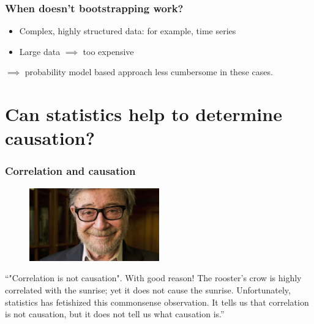 \documentclass[handout]{beamer}
\begin{document}
\begin{frame}
	\frametitle{When doesn't bootstrapping work?}
	
	\begin{itemize}
		\item Complex, highly structured data: for example, time series
		\item Large data $\implies$ too expensive
	\end{itemize}
	
	$\implies$ probability model based approach less cumbersome in these cases.
	
\end{frame}

\section{Can statistics help to determine causation?}
\frame{\tableofcontents[currentsection]}


\begin{frame}
	\frametitle{Correlation and causation}
	
	\begin{figure}[ht]
		\centerline{\includegraphics[width=0.5\textwidth]{../figures/judea_pearl.jpeg}}
	\end{figure}
	
	``"Correlation is not causation". With good reason! The rooster's crow is highly correlated with the sunrise; yet it does not cause the sunrise. Unfortunately, statistics has fetishized this commonsense observation. It tells us that correlation is not causation, but it does not tell us what causation is.''
	
\end{frame}
\end{document}
